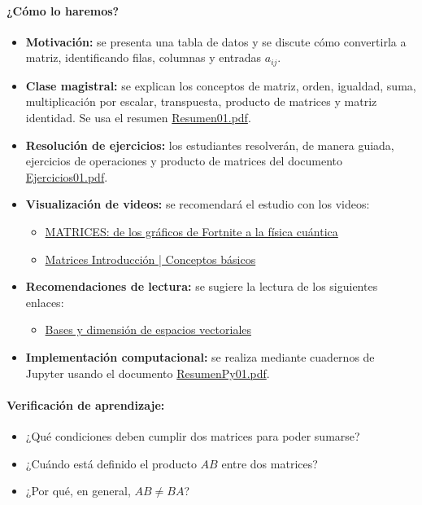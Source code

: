 \documentclass[a4,11pt]{aleph-notas}
\begin{document}
\paragraph{¿Cómo lo haremos?}  
\begin{itemize}[leftmargin=*]  
    \item \textbf{Motivación:} se presenta una tabla de datos y se discute cómo convertirla a matriz, identificando filas, columnas y entradas $a_{ij}$.
    \item \textbf{Clase magistral:} se explican los conceptos de matriz, orden, igualdad, suma, multiplicación por escalar, transpuesta, producto de matrices y matriz identidad. Se usa el resumen \href{https://andres-merino.github.io/MatematicaIII-05-N0051/01Resumen/Resumen01.pdf}{Resumen01.pdf}.  
    \item \textbf{Resolución de ejercicios:} los estudiantes resolverán, de manera guiada, ejercicios de operaciones y producto de matrices del documento \href{https://andres-merino.github.io/MatematicaIII-05-N0051/04Ejercicios/Ejercicios01.pdf}{Ejercicios01.pdf}.  
    \item \textbf{Visualización de videos:} se recomendará el estudio con los videos:  
    \begin{itemize}
        \item \href{https://youtu.be/9FKFgNQktkU?si=kGRbP9Ad-NRRciwL}{MATRICES: de los gráficos de Fortnite a la física cuántica}
        \item \href{https://youtu.be/m6w5vLA3Lnw?si=xcCeg-0snioQb-ns}{Matrices Introducción | Conceptos básicos}
    \end{itemize}  
    \item \textbf{Recomendaciones de lectura:} se sugiere la lectura de los siguientes enlaces:
    \begin{itemize}
        \item \href{https://blog.nekomath.com/algebra-lineal-i-bases-y-dimension-de-espacios-vectoriales/}{Bases y dimensión de espacios vectoriales}
    \end{itemize}
    \item \textbf{Implementación computacional:} se realiza mediante cuadernos de Jupyter usando el documento \href{https://andres-merino.github.io/MatematicaIII-05-N0051/02ResumenPython/ResumenPy01.pdf}{ResumenPy01.pdf}.
\end{itemize}  

\paragraph{Verificación de aprendizaje:} 
\begin{itemize}[leftmargin=*]  
    \item ¿Qué condiciones deben cumplir dos matrices para poder sumarse?  
    \item ¿Cuándo está definido el producto $AB$ entre dos matrices?  
    \item ¿Por qué, en general, $AB \neq BA$?  
\end{itemize}  
\end{document}
